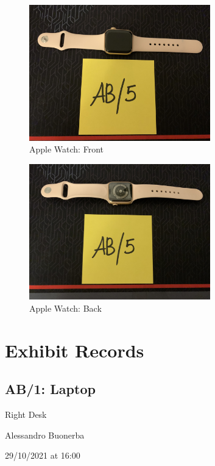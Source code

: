 \begin{figure}[h]
  \centering
  \includegraphics[width=0.7\textwidth]{figures/pictures/IMG_5051.JPG}
  \caption{Apple Watch: Front}
  \label{fig:watch-front}
\end{figure}

\begin{figure}[h]
  \centering
  \includegraphics[width=0.7\textwidth]{figures/pictures/IMG_5052.JPG}
  \caption{Apple Watch: Back}
  \label{fig:watch-back}
\end{figure}
\newpage

\section{Exhibit Records}
\label{s:exhibit-records}

\subsection{AB/1: Laptop}
\label{s:ab1-laptop}
\begin{description}[align=left]
  \item [Location:] Right Desk
  \item [Seized by:] Alessandro Buonerba
  \item [Time:] 29/10/2021 at 16:00
\end{description}

